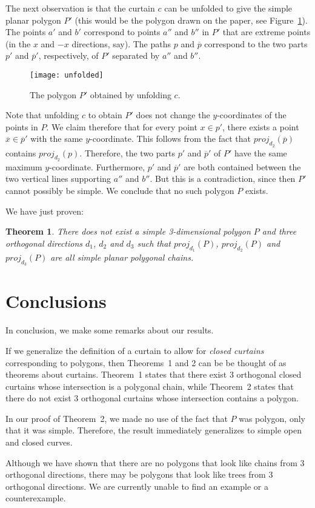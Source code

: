 \documentclass[12pt]{article}
\newcommand{\figlabel}[1]{\label{fig:#1}}
\newcommand{\figref}[1]{\mbox{Figure~\ref{fig:#1}}}
\newtheorem{thm}{Theorem}{\bfseries}{\itshape}
\newcommand{\proj}{\mathit{proj}}
\newcommand{\pbar}{\overline{p}}
\newcommand{\xbar}{\overline{x}}
\begin{document}
The next observation is that the curtain $c$ can be unfolded to give
the simple planar polygon $P'$ (this would be the polygon drawn on the
paper, see \figref{pprime}).  The points $a'$ and $b'$ correspond to
points $a''$ and $b''$ in $P'$ that are extreme points (in the $x$ and
$-x$ directions, say).  The paths $p$ and $\pbar$ correspond to the
two parts $p'$ and $\pbar'$, respectively, of $P'$ separated by $a''$
and $b''$.

\begin{figure}
\begin{center}
\texttt{[image: unfolded]}
\end{center}
\caption{The polygon $P'$ obtained by unfolding $c$.}
\figlabel{pprime}
\end{figure}

Note that unfolding $c$ to obtain $P'$ does not change the
$y$-coordinates of the points in $P$.  We claim therefore that for
every point $x\in p'$, there exists a point $\xbar\in\pbar'$ with the
same $y$-coordinate.  This follows from the fact that
$\proj_{d_2}(\pbar)$ contains $\proj_{d_2}(p)$.  Therefore, the two
parts $p'$ and $\pbar'$ of $P'$ have the same maximum $y$-coordinate.
Furthermore, $p'$ and $\pbar'$ are both contained between the two
vertical lines supporting $a''$ and $b''$.  But this is a
contradiction, since then $P'$ cannot possibly be simple.  We conclude
that no such polygon $P$ exists.

We have just proven:

\begin{thm}
There does not exist a simple 3-dimensional polygon $P$ and three
orthogonal directions $d_1$, $d_2$ and $d_3$ such that
$\proj_{d_1}(P)$, $\proj_{d_2}(P)$ and $\proj_{d_3}(P)$ are all simple
planar polygonal chains.
\end{thm}


\section{Conclusions}

In conclusion, we make some remarks about our results.

If we generalize the definition of a curtain to allow for {\em closed
curtains} corresponding to polygons, then Theorems~1 and 2 can be be
thought of as theorems about curtains.  Theorem~1 states that there
exist 3 orthogonal closed curtains whose intersection is a polygonal
chain, while Theorem~2 states that there do not exist 3 orthogonal
curtains whose intersection contains a polygon.

In our proof of Theorem~2, we made no use of the fact that $P$ was
polygon, only that it was simple.  Therefore, the result immediately
generalizes to simple open and closed curves.

Although we have shown that there are no polygons that look like
chains from 3 orthogonal directions, there may be polygons that look
like trees from 3 orthogonal directions.  We are currently unable to
find an example or a counterexample.
\end{document}
